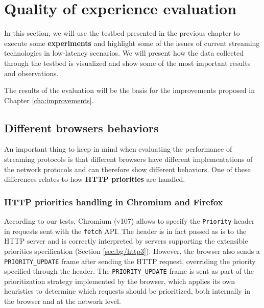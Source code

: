 \chapter{Quality of experience evaluation}
\label{cha:eval}

In this section, we will use the testbed presented in the previous chapter to execute some \textbf{experiments} and highlight some of the issues of current streaming technologies in low-latency scenarios. We will present how the data collected through the testbed is visualized and show some of the most important results and observations.

The results of the evaluation will be the basis for the improvements proposed in Chapter \ref{cha:improvements}.

\section{Different browsers behaviors}
\label{sec:eval/browsers}

An important thing to keep in mind when evaluating the performance of streaming protocols is that different browsers have different implementations of the network protocols and can therefore show different behaviors. One of these differences relates to how \textbf{HTTP priorities} are handled.

\subsection{HTTP priorities handling in Chromium and Firefox}
\label{sec:eval/browsers/priorities}

According to our tests, Chromium (v107) allows to specify the \texttt{Priority} header in requests sent with the \texttt{fetch} API. The header is in fact passed as is to the HTTP server and is correctly interpreted by servers supporting the extensible priorities specification (Section \ref{sec:bg/http3}). However, the browser also sends a \texttt{PRIORITY\_UPDATE} frame after sending the HTTP request, overriding the priority specified through the header. The \texttt{PRIORITY\_UPDATE} frame is sent as part of the prioritization strategy implemented by the browser, which applies its own heuristics to determine which requests should be prioritized, both internally in the browser and at the network level.

